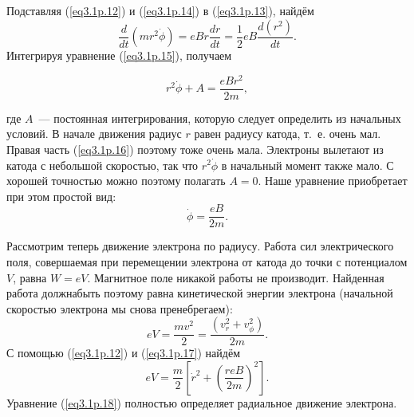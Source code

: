 Подставляя (\ref{eq3.1p.12}) и (\ref{eq3.1p.14}) в (\ref{eq3.1p.13}), найдём
\begin{equation}
\frac{d}{dt}\left(mr^2\dot{\phi}\right)=eBr\frac{dr}{dt}=\frac12eB\frac{d(r^2)}{dt}.
\label{eq3.1p.15}
\end{equation}
Интегрируя уравнение (\ref{eq3.1p.15}), получаем

\begin{equation}
r^2\dot{\phi}+A=\frac{eBr^2}{2m},
\label{eq3.1p.16}
\end{equation}

где $A$~--- постоянная интегрирования, которую следует определить из начальных условий. В начале движения радиус $r$ равен радиусу катода, т.~е. очень мал. Правая часть (\ref{eq3.1p.16}) поэтому тоже очень мала. Электроны вылетают из катода с небольшой скоростью, так что $r^{2}\dot{\phi}$ в начальный момент также мало. С хорошей точностью можно поэтому полагать $A=0$. Наше уравнение приобретает при этом простой вид:
\begin{equation}
\dot{\phi}=\frac{eB}{2m}.
\label{eq3.1p.17}
\end{equation}

Рассмотрим теперь движение электрона по радиусу. Работа сил электрического поля, совершаемая при перемещении электрона от катода до точки с потенциалом $V$, равна $W=eV$. Магнитное поле никакой работы не производит. Найденная работа должнабыть поэтому равна кинетической энергии электрона (начальной скоростью электрона мы снова пренебрегаем):
$$
eV=\frac{mv^2}{2}=\frac{(v_r^2+v_\phi^2)}{2m}.
$$
С помощью (\ref{eq3.1p.12}) и (\ref{eq3.1p.17}) найдём
\begin{equation}
eV=\frac{m}{2}\left[\dot{r}^2+\left(\frac{reB}{2m}\right)^2\right].
\label{eq3.1p.18}
\end{equation}
Уравнение (\ref{eq3.1p.18}) полностью определяет радиальное движение электрона.



